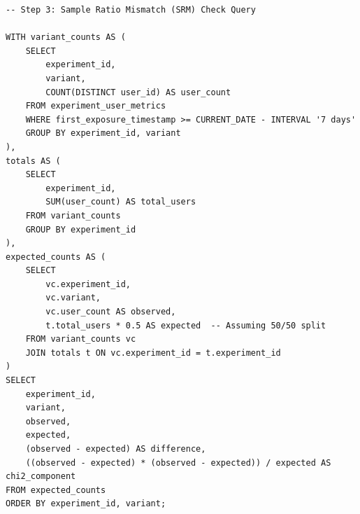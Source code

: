 \begin{lstlisting}
-- Step 3: Sample Ratio Mismatch (SRM) Check Query

WITH variant_counts AS (
    SELECT
        experiment_id,
        variant,
        COUNT(DISTINCT user_id) AS user_count
    FROM experiment_user_metrics
    WHERE first_exposure_timestamp >= CURRENT_DATE - INTERVAL '7 days'
    GROUP BY experiment_id, variant
),
totals AS (
    SELECT
        experiment_id,
        SUM(user_count) AS total_users
    FROM variant_counts
    GROUP BY experiment_id
),
expected_counts AS (
    SELECT
        vc.experiment_id,
        vc.variant,
        vc.user_count AS observed,
        t.total_users * 0.5 AS expected  -- Assuming 50/50 split
    FROM variant_counts vc
    JOIN totals t ON vc.experiment_id = t.experiment_id
)
SELECT
    experiment_id,
    variant,
    observed,
    expected,
    (observed - expected) AS difference,
    ((observed - expected) * (observed - expected)) / expected AS chi2_component
FROM expected_counts
ORDER BY experiment_id, variant;
\end{lstlisting}

